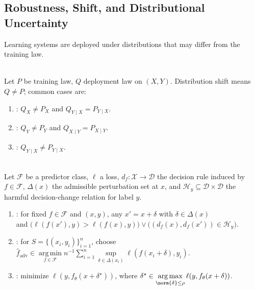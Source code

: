 \subsection{Robustness, Shift, and Distributional Uncertainty}

Learning systems are deployed under distributions that may differ from the training law.

\begin{definition} \label{def:sl-distribution-shift-types} \\
Let $P$ be training law, $Q$ deployment law on $(X,Y)$. Distribution shift means $Q\ne P$; common cases are:
\begin{enumerate}[label=(\roman*)]
\setlength{\itemsep}{0pt}
\item {}: $Q_X\ne P_X$ and $Q_{Y\mid X}=P_{Y\mid X}$.
\item {}: $Q_Y\ne P_Y$ and $Q_{X\mid Y}=P_{X\mid Y}$.
\item {}: $Q_{Y\mid X}\ne P_{Y\mid X}$.
\end{enumerate}
\end{definition}

\begin{definition} \label{def:sl-adversarial-example} \\
Let $\mathcal{F}$ be a predictor class, $\ell$ a loss, $d_f:\mathcal{X}\to\mathcal{D}$ the decision rule induced by $f\in\mathcal{F}$, $\Delta(x)$ the admissible perturbation set at $x$, and $\mathcal{H}_y\subseteq\mathcal{D}\times\mathcal{D}$ the harmful decision-change relation for label $y$.
\begin{enumerate}[label=(\roman*)]
\setlength{\itemsep}{0pt}
\item {}: for fixed $f\in\mathcal{F}$ and $(x,y)$, any $x'=x+\delta$ with $\delta\in\Delta(x)$\\
and $\bigl(\ell(f(x'),y)>\ell(f(x),y)\bigr)\vee\bigl((d_f(x),d_f(x'))\in\mathcal{H}_y\bigr)$.
\item {}: for $S=\{(x_i,y_i)\}_{i=1}^n$, choose $\widehat f_{\mathrm{adv}}\in\operatorname*{arg\,min}\limits_{f\in\mathcal{F}}n^{-1}\sum\limits_{i=1}^n\sup\limits_{\delta\in\Delta(x_i)}\ell(f(x_i+\delta),y_i)$.
\item {}: minimize $\ell(y,f_\theta(x+\delta^\star))$, where $\delta^\star\in\operatorname*{arg\,max}\limits_{\norm{\delta}\leq\rho}\ell(y,f_\theta(x+\delta))$.
\end{enumerate}
\end{definition}

